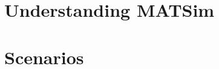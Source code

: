 
 \cleardoublepage
 \cleardoublepage

\part{Understanding MATSim} \cleardoublepage
\label{part:understanding-matsim}
 \cleardoublepage
 \cleardoublepage
 \cleardoublepage
 \cleardoublepage
 \cleardoublepage
 \cleardoublepage

\part{Scenarios} \cleardoublepage
\label{part:scenarios}
 \cleardoublepage
 \cleardoublepage

